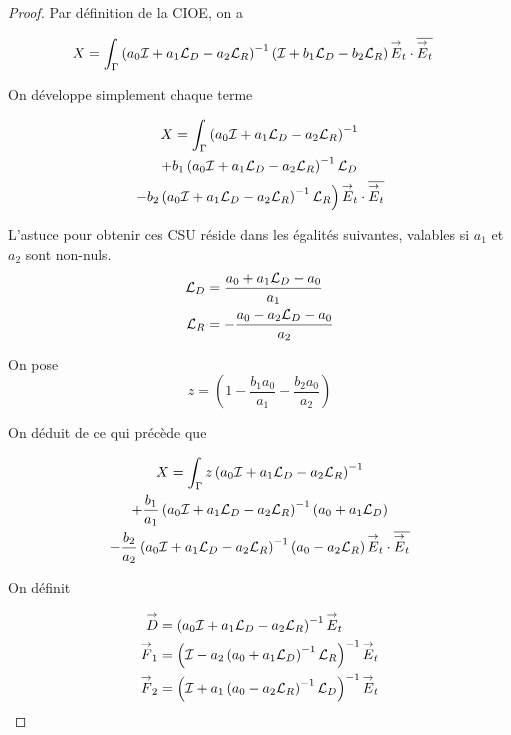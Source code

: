   \begin{proof}
    Par définition de la CIOE, on a

    \begin{align}
      X &= \int_\Gamma \left(a_0{\mathcal{I}} + a_1 {\mathcal{L}_D} - a_2 {\mathcal{L}_R} \right)^{-1}\left({\mathcal{I}} + b_1 {\mathcal{L}_D} - b_2 {\mathcal{L}_R} \right) {\overset{\rightarrow}{E}}_t\cdot {\overline{{\overset{\rightarrow}{E}}_t}}
    \end{align}

    On développe simplement chaque terme

    \begin{multline}
      X = \int_\Gamma \left(a_0{\mathcal{I}} + a_1 {\mathcal{L}_D} - a_2 {\mathcal{L}_R} \right)^{-1}
      \\
      + b_1 \left(a_0{\mathcal{I}} + a_1 {\mathcal{L}_D} - a_2 {\mathcal{L}_R} \right)^{-1}{\mathcal{L}_D}
      \\
      \left.
      - b_2 \left(a_0{\mathcal{I}} + a_1 {\mathcal{L}_D} - a_2 {\mathcal{L}_R} \right)^{-1}{\mathcal{L}_R} \right) {\overset{\rightarrow}{E}}_t\cdot {\overline{{\overset{\rightarrow}{E}}_t}}
    \end{multline}

    L'astuce pour obtenir ces CSU réside dans les égalités suivantes, valables si \(a_1\) et \(a_2\) sont non-nuls.
    \begin{align}
      {\mathcal{L}_D} & = \dfrac{a_0 + a_1 {\mathcal{L}_D} - a_0}{a_1}
      \\
      {\mathcal{L}_R} & = -\dfrac{a_0 - a_2 {\mathcal{L}_D} - a_0}{a_2}
    \end{align}

    On pose
    \begin{equation}
      z = \left(1 - \frac{b_1a_0}{a_1} - \frac{b_2a_0}{a_2}\right)
    \end{equation}

    On déduit de ce qui précède que

    \begin{multline}
      X = \int_\Gamma z\left(a_0{\mathcal{I}} + a_1 {\mathcal{L}_D} - a_2 {\mathcal{L}_R} \right)^{-1}
      \\
      + \dfrac{b_1}{a_1} \left(a_0{\mathcal{I}} + a_1 {\mathcal{L}_D} - a_2 {\mathcal{L}_R} \right)^{-1}\left(a_0+a_1{\mathcal{L}_D}\right)
      \\
      - \dfrac{b_2}{a_2} \left(a_0{\mathcal{I}} + a_1 {\mathcal{L}_D} - a_2 {\mathcal{L}_R} \right)^{-1}\left(a_0-a_2{\mathcal{L}_R}\right) {\overset{\rightarrow}{E}}_t\cdot {\overline{{\overset{\rightarrow}{E}}_t}}
    \end{multline}

    On définit

    \newcommand{\vD}{\vect{D}}
    \newcommand{\vF}{\vect{F}}

    \begin{align}
      \vD & = \left(a_0 \oI + a_1 \LD - a_2\LR \right)^{-1} \vE_t
      \\
      \vF_1 & = \left(\oI - a_2 \left( a_0 + a_1\LD\right)^{-1}\LR\right)^{-1} \vE_t
      \\
      \vF_2 & = \left(\oI + a_1 \left( a_0 - a_2\LR\right)^{-1}\LD\right)^{-1} \vE_t
    \end{align}


\end{proof}
